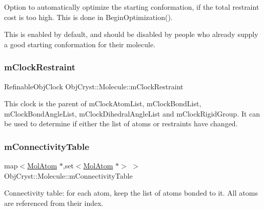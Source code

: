Option to automatically optimize the starting conformation, if the total restraint cost is too high. This is done in Begin\+Optimization().

This is enabled by default, and should be disabled by people who already supply a good starting conformation for their molecule. \mbox{\label{class_obj_cryst_1_1_molecule_a8bbd805ad8444c1470aea55544a9fb7f}} 
\subsubsection{\texorpdfstring{mClockRestraint}{mClockRestraint}}
{\footnotesize\ttfamily Refinable\+Obj\+Clock Obj\+Cryst\+::\+Molecule\+::m\+Clock\+Restraint}

This clock is the parent of m\+Clock\+Atom\+List, m\+Clock\+Bond\+List, m\+Clock\+Bond\+Angle\+List, m\+Clock\+Dihedral\+Angle\+List and m\+Clock\+Rigid\+Group. It can be used to determine if either the list of atoms or restraints have changed. \mbox{\label{class_obj_cryst_1_1_molecule_a13cffa530711a868859cfcfc17bce069}} 
\subsubsection{\texorpdfstring{mConnectivityTable}{mConnectivityTable}}
{\footnotesize\ttfamily map$<$\mbox{\hyperlink{class_obj_cryst_1_1_mol_atom}{Mol\+Atom}} $\ast$,set$<$\mbox{\hyperlink{class_obj_cryst_1_1_mol_atom}{Mol\+Atom}} $\ast$$>$ $>$ Obj\+Cryst\+::\+Molecule\+::m\+Connectivity\+Table\hspace{0.3cm}{\ttfamily [mutable]}}

Connectivity table\+: for each atom, keep the list of atoms bonded to it. All atoms are referenced from their index. \mbox{\label{class_obj_cryst_1_1_molecule_a5b35796cbf31728b39b82c36badaa97b}} 
